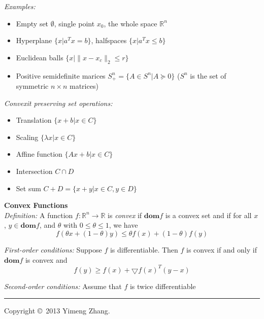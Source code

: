 \documentclass[10pt,landscape]{article}
\begin{document}
\begin{multicols}{3}
\emph{Examples:}
\begin{itemize}
	\item Empty set $\emptyset$, single point ${x_0}$, the whole space $\mathbb{R}^n$
	\item Hyperplane $\{ x | a^T x = b \}$, halfspaces $\{ x | a^T x \leq b \}$
	\item Euclidean balls $\{ x | \| x - x_c \|_2 \leq r \}$
	\item Positive semidefinite marices $S_+^n = \{ A \in S^n | A \succeq 0 \}$ ($S^n$ is the set of symmetric $n \times n$ matrices)
\end{itemize}

\emph{Convexit preserving set operations:}
\begin{itemize}
	\item Translation $\{ x + b | x \in C \}$
	\item Scaling $\{ \lambda x | x \in C \}$
	\item Affine function $\{ Ax + b | x \in C\}$
	\item Intersection $C \cap D$
	\item Set sum $C + D = \{ x + y | x \in C, y \in D \}$
\end{itemize}

\textbf{Convex Functions} \\
\emph{Definition:} A function $f: \mathbb{R}^n \to \mathbb{R}$ is \emph{convex} if $\mathbf{dom} f$ is a convex set and if for all $x$, $y \in \mathbf{dom} f$, and $\theta$ with $0 \leq \theta \leq 1$, we have \\
$$ f(\theta x + (1 - \theta) y) \leq \theta f(x) + (1 - \theta) f(y) $$

\emph{First-order conditions:} Suppose $f$ is differentiable. Then $f$ is convex if and only if $\mathbf{dom} f$ is convex and
$$ f(y) \geq f(x) + \bigtriangledown f(x)^T (y-x) $$

\emph{Second-order conditions:} Assume that $f$ is twice differentiable


\rule{0.3\linewidth}{0.25pt}
\scriptsize

Copyright \copyright\ 2013 Yimeng Zhang.

\end{multicols}
\end{document}
